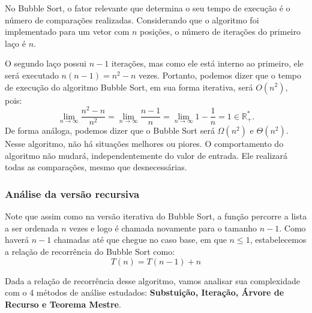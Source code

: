 No Bubble Sort, o fator relevante que determina o seu tempo de execução é o número de comparações realizadas. Considerando que o algoritmo foi implementado para um vetor com \( n \) posições, o número de iterações do primeiro laço é \( n \).

O segundo laço possui \( n-1 \) iterações, mas como ele está interno ao primeiro, ele será executado \( n(n-1) = n^2 - n \) vezes. Portanto, podemos dizer que o tempo de execução do algoritmo Bubble Sort, em sua forma iterativa, será \( O(n^2) \), pois:
\[
	\lim_{n \rightarrow \infty} \frac{n^2 - n}{n^2} =
	\lim_{n \rightarrow \infty} \frac{n - 1}{n} =
	\lim_{n \rightarrow \infty} 1-\frac{1}{n} =
	1 \in \mathbb{R}^*_+.
\]
\indent De forma análoga, podemos dizer que o Bubble Sort será \( \Omega(n^2) \) e \( \Theta(n^2) \). Nesse algoritmo, não há situações melhores ou piores. O comportamento do algoritmo não mudará, independentemente do valor de entrada. Ele realizará todas as comparações, mesmo que desnecessárias.


\subsubsection{Análise da versão recursiva}
Note que assim como na versão iterativa do Bubble Sort, a função percorre a lista a ser ordenada $n$ vezes e logo é chamada novamente para o tamanho $n - 1$. Como haverá $n - 1$ chamadas até que chegue no caso base, em que $n \leq 1$, estabelecemos a relação de recorrência do Bubble Sort como:
$$
	T(n) = T(n - 1) + n
$$

\indent Dada a relação de recorrência desse algoritmo, vamos analisar sua complexidade com o 4 métodos de análise estudados: \textbf{Substuição, Iteração, Árvore de Recurso e Teorema Mestre}.

